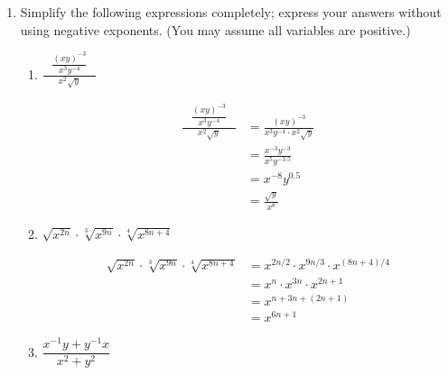 \documentclass{article}
\begin{document}
\begin{enumerate}
\begin{enumerate}
    \begin{solution}
      $32 x^{23} + 16 x^{14} + 2 x^5$
    \end{solution}

  \item Simplify the following expressions completely; express your
    answers without using negative exponents. (You may assume all
    variables are positive.)

    \begin{enumerate}
    \item
      \begin{problem}[\vfill\newpage]
        $\displaystyle \frac{\quad \dfrac{(xy)^{-3}}{x^3y^{-4}}
          \quad}{x^2 \sqrt{y}}$
      \end{problem}

      \begin{solution}
        \begin{align*}
          \frac{\quad \dfrac{(xy)^{-3}}{x^3y^{-4}} \quad}{x^2 \sqrt{y}}
          &= \frac{(xy)^{-3}}{x^3 y^{-4} \cdot x^2 \sqrt{y}} \\
          &= \frac{x^{-3} y^{-3}}{x^5 y^{-3.5}} \\
          &= x^{-8} y^{0.5} \\
          &= \boxed{\frac{\sqrt{y}}{x^8}}
        \end{align*}
      \end{solution}

    \item
      \begin{problem}[\vfill]
        $\sqrt{x^{2n}}\cdot\sqrt[3]{x^{9n}}\cdot\sqrt[4]{x^{8n+4}}$
      \end{problem}

      \begin{solution}
        \begin{align*}
          \sqrt{x^{2n}}\cdot\sqrt[3]{x^{9n}}\cdot\sqrt[4]{x^{8n+4}} &=
          x^{2n / 2} \cdot x^{9n / 3} \cdot x^{(8n + 4) / 4} \\
          &= x^n \cdot x^{3n} \cdot x^{2n + 1} \\
          &= x^{n + 3n + (2n + 1)} \\
          &= \boxed{x^{6n + 1}}
        \end{align*}
      \end{solution}

    \item
      \begin{problem}[\vfill]
        $\dfrac{x^{-1}y+y^{-1}x}{x^2+y^2}$
      \end{problem}


\end{enumerate}
\end{enumerate}
\end{enumerate}
\end{document}
